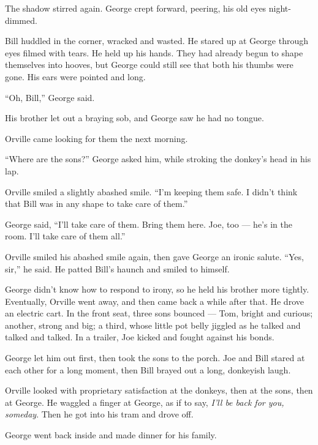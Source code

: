 The shadow stirred again. George crept forward, peering, his old
eyes night-dimmed.

Bill huddled in the corner, wracked and wasted. He stared up at
George through eyes filmed with tears. He held up his hands. They
had already begun to shape themselves into hooves, but George could
still see that both his thumbs were gone. His ears were pointed and
long.

``Oh, Bill,'' George said.

His brother let out a braying sob, and George saw he had no
tongue.

\tb

Orville came looking for them the next morning.

``Where are the sons?'' George asked him, while stroking the
donkey's head in his lap.

Orville smiled a slightly abashed smile.
``I'm keeping them safe. I didn't think that Bill was in any shape to take care 
of them.''

George said,
``I'll take care of them. Bring them here. Joe, too --- he's in the room. I'll 
take care of them all.''

Orville smiled his abashed smile again, then gave George an ironic
salute. ``Yes, sir,'' he said. He patted Bill's haunch and smiled
to himself.

George didn't know how to respond to irony, so he held his brother
more tightly. Eventually, Orville went away, and then came back a
while after that. He drove an electric cart. In the front seat,
three sons bounced --- Tom, bright and curious; another, strong and
big; a third, whose little pot belly jiggled as he talked and
talked and talked. In a trailer, Joe kicked and fought against his
bonds.

George let him out first, then took the sons to the porch. Joe and
Bill stared at each other for a long moment, then Bill brayed out a
long, donkeyish laugh.

Orville looked with proprietary satisfaction at the donkeys, then
at the sons, then at George. He waggled a finger at George, as if
to say, \emph{I'll be back for you, someday}. Then he got into his
tram and drove off.

George went back inside and made dinner for his family.


